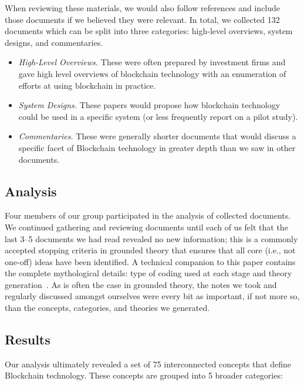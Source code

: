 When reviewing these materials, we would also follow references and include those documents if we believed they were relevant. In total, we collected 132 documents which can be split into three categories: high-level overviews, system designs, and commentaries.

\begin{itemize}
	\item \emph{High-Level Overviews.} These were often prepared by investment firms and gave high level overviews of blockchain technology with an enumeration of efforts at using blockchain in practice.
	\item \emph{System Designs.} These papers would propose how blockchain technology could be used in a specific system (or less frequently report on a pilot study).
	\item \emph{Commentaries.} These were generally shorter documents that would discuss a specific facet of Blockchain technology in greater depth than we saw in other documents.
\end{itemize}

\subsection{Analysis}

Four members of our group participated in the analysis of collected documents.
We continued gathering and reviewing documents until each of us felt that the last 3--5 documents we had read revealed no new information; this is a commonly accepted stopping criteria in grounded theory that ensures that all core (i.e., not one-off) ideas have been identified. A technical companion to this paper contains the complete mythological details: type of coding used at each stage and theory generation~\cite{RKYCC19}. As is often the case in grounded theory, the notes we took and regularly discussed amongst ourselves were every bit as important, if not more so, than the concepts, categories, and theories we generated.

\subsection{Results}

Our analysis ultimately revealed a set of 75 interconnected concepts that define Blockchain technology. These concepts are grouped into 5 broader categories:

